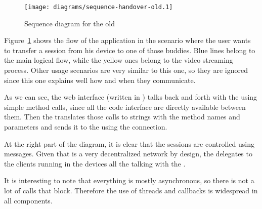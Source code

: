 \begin{figure}[htbp]
  \centering
    \texttt{[image: diagrams/sequence-handover-old.1]}
  \caption{Sequence diagram for the old }
  \label{fig:sequence-handover-old}
\end{figure}

Figure~\ref{fig:sequence-handover-old} shows the flow of the application in the scenario where the user wants to transfer a session from his device to one of those buddies.
Blue lines belong to the main logical flow, while the yellow ones belong to the video streaming process.
Other usage scenarios are very similar to this one, so they are ignored since this one explains well how and when they communicate.

As we can see, the web interface (written in ) talks back and forth with the  using simple method calls, since all the code interface are directly available between them.
Then the  translates those calls to strings with the method names and parameters and sends it to the  using the  connection.

At the right part of the diagram, it is clear that the sessions are controlled using  messages.
Given that  is a very decentralized network by design, the  delegates to the  clients running in the devices all the talking with the .

It is interesting to note that everything is mostly asynchronous, so there is not a lot of calls that block.
Therefore the use of threads and callbacks is widespread in all components.

